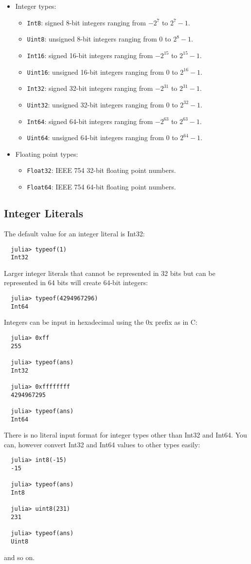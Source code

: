 \documentclass{article}
\begin{document}
\begin{itemize}
  \item Integer types:
  \begin{itemize}
    \item \texttt{Int8}: signed 8-bit integers ranging from $-2^7$ to $2^7-1$.
    \item \texttt{Uint8}: unsigned 8-bit integers ranging from 0 to $2^8-1$.
    \item \texttt{Int16}: signed 16-bit integers ranging from $-2^{15}$ to $2^{15}-1$.
    \item \texttt{Uint16}: unsigned 16-bit integers ranging from 0 to $2^{16}-1$.
    \item \texttt{Int32}: signed 32-bit integers ranging from $-2^{31}$ to $2^{31}-1$.
    \item \texttt{Uint32}: unsigned 32-bit integers ranging from 0 to $2^{32}-1$.
    \item \texttt{Int64}: signed 64-bit integers ranging from $-2^{63}$ to $2^{63}-1$.
    \item \texttt{Uint64}: unsigned 64-bit integers ranging from 0 to $2^{64}-1$.
  \end{itemize}
  \item Floating point types:
  \begin{itemize}
    \item \texttt{Float32}: IEEE 754 32-bit floating point numbers.
    \item \texttt{Float64}: IEEE 754 64-bit floating point numbers.
  \end{itemize}
\end{itemize}

\subsection{Integer Literals}

The default value for an integer literal is Int32:
\begin{verbatim}
  julia> typeof(1)
  Int32
\end{verbatim}
Larger integer literals that cannot be represented in 32 bits but can be represented in 64 bits will create 64-bit integers:
\begin{verbatim}
  julia> typeof(4294967296)
  Int64
\end{verbatim}
Integers can be input in hexadecimal using the 0x prefix as in C:
\begin{verbatim}
  julia> 0xff
  255

  julia> typeof(ans)
  Int32

  julia> 0xffffffff
  4294967295

  julia> typeof(ans)
  Int64
\end{verbatim}
There is no literal input format for integer types other than Int32 and Int64. You can, however convert Int32 and Int64 values to other types easily:
\begin{verbatim}
  julia> int8(-15)
  -15

  julia> typeof(ans)
  Int8

  julia> uint8(231)
  231

  julia> typeof(ans)
  Uint8
\end{verbatim}
and so on.
\end{document}
